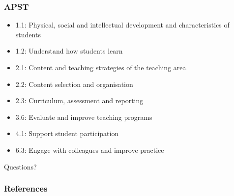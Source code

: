 \documentclass[14pt]{beamer}
\begin{document}
\begin{frame}
\frametitle{APST}
\begin{itemize}
	\item 1.1: Physical, social and intellectual development and characteristics of students
	\item 1.2: Understand how students learn
	\item 2.1: Content and teaching strategies of the teaching area
	\item 2.2: Content selection and organisation
	\item 2.3: Curriculum, assessment and reporting
	\item 3.6: Evaluate and improve teaching programs
	\item 4.1: Support student participation
	\item 6.3: Engage with colleagues and improve practice
\end{itemize}
\end{frame}


\begin{frame}
\begin{center}
{\Huge
Questions?
}
\end{center}
\end{frame}

\begin{frame}[allowframebreaks]
    \frametitle{References}
	
	 
\end{frame}
\end{document}
